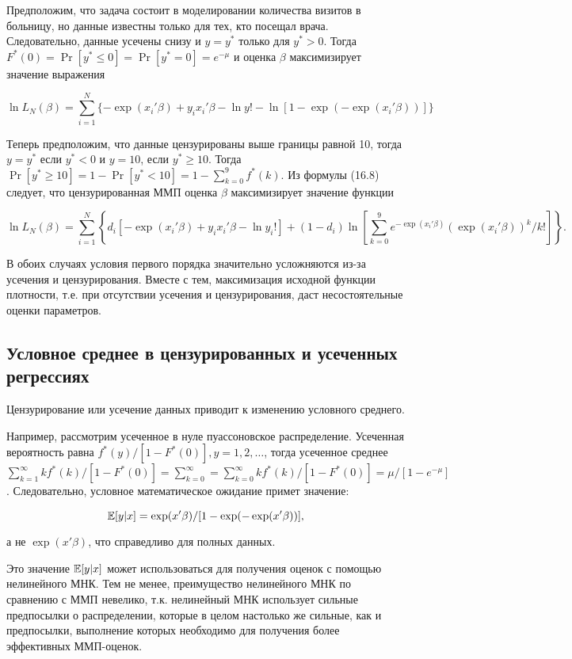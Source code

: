 Предположим, что задача состоит в моделировании количества визитов в больницу, но данные известны только для тех, кто посещал врача. Следовательно, данные усечены снизу и $y=y^* $ только для $y^* >0$. Тогда $F^{*}(0)=\Pr[ y^*  \leq 0]=\Pr[ y^* =0]=e^{-\mu}$ и оценка $\beta$ максимизирует значение выражения

\[
\ln{ L_N(\beta)}=\sum_{i=1}^N{\lbrace-\exp (x_i'\beta)+y_ix_i'\beta-\ln{ y!}-\ln[1-\exp (-\exp (x_i'\beta))]\rbrace}
\]


Теперь предположим, что данные цензурированы выше границы равной 10, тогда $y=y^* $ если $y^* <0$ и $y=10$, если $y^* {\geq}10$. Тогда $\Pr[ y^* {\geq}10]=1-\Pr[ y^* <10]=1-\sum_{k=0}^9 f^{*}(k)$. Из формулы (16.8) следует, что цензурированная ММП оценка $\beta$ максимизирует значение функции


\[
\ln{L_N(\beta)}=\sum_{i=1}^N \left\lbrace d_i[-\exp (x_i'\beta)+y_ix_i'\beta-\ln{ y_i}!]+(1-d_i)\ln{ \left[\sum_{k=0}^9 e^{-\exp (x_i'\beta)}(\exp (x_i'\beta))^{k}/k!\right]}\right\rbrace.
\]


В обоих случаях условия первого порядка значительно усложняются из-за усечения и цензурирования. Вместе с тем, максимизация исходной функции плотности, т.е. при отсутствии усечения и цензурирования, даст несостоятельные оценки параметров.

\subsection{Условное среднее в цензурированных и усеченных регрессиях}

Цензурирование или усечение данных приводит к изменению условного среднего.

Например, рассмотрим усеченное в нуле пуассоновское распределение. Усеченная вероятность равна $f^{*}(y)/[1-F^{*}(0)], y=1,2,\ldots $, тогда усеченное среднее $\sum^{\infty}_{k=1}kf^{*}(k)/[1-F^{*}(0)]=\sum^{\infty}_{k=0}=\sum^{\infty}_{k=0}kf^{*}(k)/[1-F^{*}(0)]=\mu/[1-e^{-\mu}]$. Следовательно, условное математическое ожидание примет значение:


\[
\mathbb{E}[y|x]=\exp (x'\beta)/[1-\exp (-\exp (x'\beta))],
\]

а не $\exp (x'\beta)$, что справедливо для полных данных.

Это значение $\mathbb{E}[y|x]$ может использоваться для получения оценок с помощью нелинейного МНК. Тем не менее, преимущество нелинейного МНК по сравнению с ММП невелико, т.к. нелинейный МНК использует сильные предпосылки о распределении, которые в целом настолько же сильные, как и предпосылки, выполнение которых необходимо для получения более эффективных ММП-оценок.

